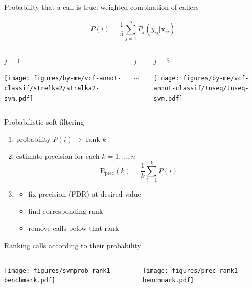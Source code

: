 \documentclass{beamer}
\begin{document}
\begin{frame}{Probability that a call is true: weighted combination of callers}
\begin{center}
\[
P(i) = \frac{1}{5} \sum_{j=1}^5 P_j(y_{ij} | \mathbf{x}_{ij})
\]
\end{center}
\begin{columns}[t]
\begin{column}{0.33\textwidth}
\begin{center}
\(j=1\)
\end{center}

\texttt{[image: figures/by-me/vcf-annot-classif/strelka2/strelka2-svm.pdf]}
\end{column}

\begin{column}{0.33\textwidth}
\begin{center}
\(j=...\)

\vspace{0.7in}
\large
\(\cdots\)
\normalsize
\end{center}
\end{column}

\begin{column}{0.33\textwidth}
\begin{center}
\(j=5\)
\end{center}

\texttt{[image: figures/by-me/vcf-annot-classif/tnseq/tnseq-svm.pdf]}
\end{column}
\end{columns}
\end{frame}

\begin{frame}{Probabilistic soft filtering}
\begin{enumerate}
\item probability \(P(i) \rightarrow \) rank \(k\)
\item estimate precision for each \(k=1,...,n\)
\[
\mathrm{E}_\mathrm{prec}(k) = \frac{1}{k} \sum_{i=1}^k P(i)
\] 
\item
\begin{itemize}
\item fix precision (FDR) at desired value
\item find corresponding rank
\item remove calls below that rank 
\end{itemize}
\end{enumerate}
\end{frame}

\begin{frame}{Ranking calls according to their probability}
\begin{columns}[t]
\begin{column}{0.5\textwidth}

\texttt{[image: figures/svmprob-rank1-benchmark.pdf]}
\end{column}

\begin{column}{0.5\textwidth}

\texttt{[image: figures/prec-rank1-benchmark.pdf]}
\end{column}
\end{columns}
\end{frame}
\end{document}
